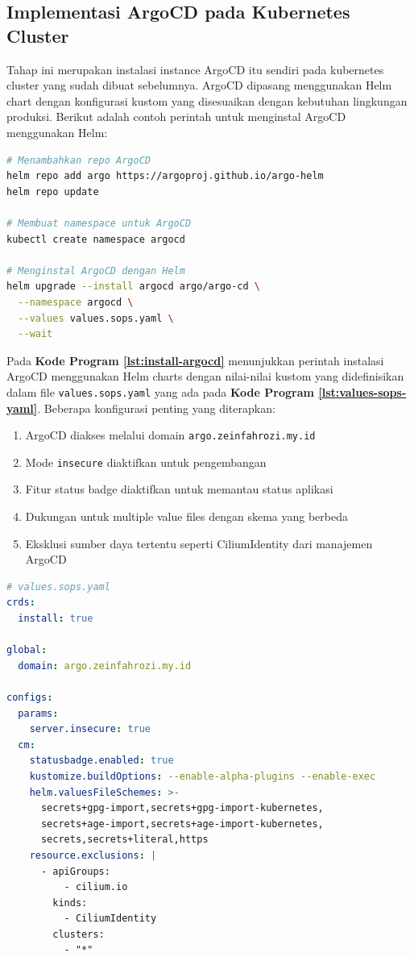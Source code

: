 \subsection{Implementasi ArgoCD pada Kubernetes Cluster}\label{sec:bab4_implementasi_argocd}
Tahap ini merupakan instalasi instance ArgoCD itu sendiri pada kubernetes
cluster yang sudah dibuat sebelumnya. ArgoCD dipasang menggunakan Helm chart
dengan konfigurasi kustom yang disesuaikan dengan kebutuhan lingkungan
produksi. Berikut adalah contoh perintah untuk menginstal ArgoCD menggunakan
Helm:

\begin{lstlisting}[language=bash, 
  basicstyle=\footnotesize\ttfamily,
  caption={Perintah Instalasi ArgoCD menggunakan Helm},
  label={lst:install-argocd}]
# Menambahkan repo ArgoCD
helm repo add argo https://argoproj.github.io/argo-helm
helm repo update

# Membuat namespace untuk ArgoCD
kubectl create namespace argocd

# Menginstal ArgoCD dengan Helm
helm upgrade --install argocd argo/argo-cd \
  --namespace argocd \
  --values values.sops.yaml \
  --wait
\end{lstlisting}

Pada \textbf{Kode Program \ref{lst:install-argocd}} menunjukkan perintah
instalasi ArgoCD menggunakan Helm charts dengan nilai-nilai kustom yang
didefinisikan dalam file \texttt{values.sops.yaml} yang ada pada \textbf{Kode
  Program \ref{lst:values-sops-yaml}}. Beberapa konfigurasi penting yang
diterapkan:

\begin{enumerate}[label=\alph*.]
  \item ArgoCD diakses melalui domain \texttt{argo.zeinfahrozi.my.id}
  \item Mode \texttt{insecure} diaktifkan untuk pengembangan
  \item Fitur status badge diaktifkan untuk memantau status aplikasi
  \item Dukungan untuk multiple value files dengan skema yang berbeda
  \item Eksklusi sumber daya tertentu seperti CiliumIdentity dari manajemen ArgoCD
\end{enumerate}

\begin{lstlisting}[language=yaml, 
  basicstyle=\footnotesize\ttfamily,
  caption={Contoh konfigurasi \texttt{values.sops.yaml} untuk ArgoCD},
  label={lst:values-sops-yaml}]
# values.sops.yaml
crds:
  install: true

global:
  domain: argo.zeinfahrozi.my.id

configs:
  params:
    server.insecure: true
  cm:
    statusbadge.enabled: true
    kustomize.buildOptions: --enable-alpha-plugins --enable-exec
    helm.valuesFileSchemes: >-
      secrets+gpg-import,secrets+gpg-import-kubernetes,
      secrets+age-import,secrets+age-import-kubernetes,
      secrets,secrets+literal,https
    resource.exclusions: |
      - apiGroups:
          - cilium.io
        kinds:
          - CiliumIdentity
        clusters:
          - "*"
\end{lstlisting}

